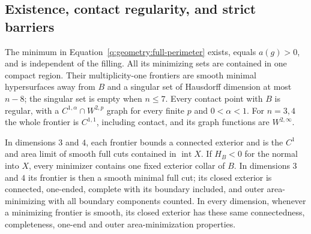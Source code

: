 \subsection{Existence, contact regularity, and strict barriers}

\begin{proposition}
\label{q:geometry:enclosure}
The minimum in Equation~\eqref{q:geometry:full-perimeter} exists,
equals $a(g)>0$, and is independent of the filling. All its minimizing
sets are contained in one compact region. Their multiplicity-one
frontiers are smooth minimal hypersurfaces away from $B$ and a
singular set of Hausdorff dimension at most $n-8$; the singular set is
empty when $n\le7$. Every contact point with $B$ is regular, with a
$C^{1,\alpha}\cap W^{2,p}$ graph for every finite $p$ and
$0<\alpha<1$. For $n=3,4$ the whole frontier is $C^{1,1}$, including
contact, and its graph functions are $W^{2,\infty}$.

In dimensions $3$ and $4$, each frontier bounds a connected exterior
and is the $C^1$ and area limit of smooth full cuts contained in
$\operatorname{int}X$. If $H_B<0$ for the normal into $X$, every
minimizer contains one fixed exterior collar of $B$. In dimensions
$3$ and $4$ its frontier is then a smooth minimal full cut; its closed
exterior is connected, one-ended, complete with its boundary included,
and outer area-minimizing with all boundary components counted.
In every dimension, whenever a minimizing frontier is smooth, its
closed exterior has these same connectedness, completeness, one-end
and outer area-minimization properties.
\end{proposition}

